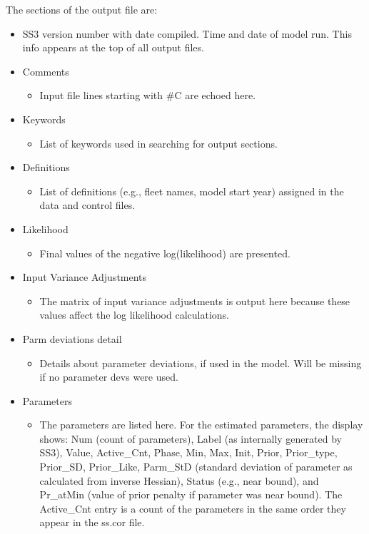 The sections of the output file are:
\begin{itemize}
	\item SS3 version number with date compiled. Time and date of model run. This info appears at the top of all output files.
	\item Comments
		\begin{itemize}
			\item Input file lines starting with \#C are echoed here.
		\end{itemize}
	\item Keywords
		\begin{itemize}
			\item List of keywords used in searching for output sections.
		\end{itemize}
	\item Definitions
		\begin{itemize}
			\item List of definitions (e.g., fleet names, model start year) assigned in the data and control files.
		\end{itemize}
	\item Likelihood
		\begin{itemize}
			\item Final values of the negative log(likelihood) are presented.
		\end{itemize}
	\item Input Variance Adjustments
		\begin{itemize}
			\item The matrix of input variance adjustments is output here because these values affect the log likelihood calculations.
		\end{itemize}
	\item{Parm deviations detail}
	    \begin{itemize}
		    \item Details about parameter deviations, if used in the model. Will be missing if no parameter devs were used.
		\end{itemize}
	\item Parameters
		\begin{itemize}
			\item The parameters are listed here. For the estimated parameters, the display shows: Num (count of parameters), Label (as internally generated by SS3), Value, Active\_Cnt, Phase, Min, Max, Init, Prior, Prior\_type, Prior\_SD, Prior\_Like, Parm\_StD (standard deviation of parameter as calculated from inverse Hessian), Status (e.g., near bound), and Pr\_atMin (value of prior penalty if parameter was near bound). The Active\_Cnt entry is a count of the parameters in the same order they appear in the ss.cor file.

\end{itemize}
\end{itemize}
